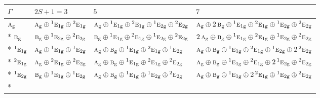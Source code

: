 \documentclass[10pt,a4paper]{article}
\numberwithin{equation}{section}
\newcommand{\irr}[1]{\text{\normalfont\scshape #1}}
\newcommand{\conjpair}[1]{{}^{#1}}
\newcommand{\ptag}[1]{\mathrm{#1}}
\begin{document}
{\small\setlength{\tabcolsep}{3pt}\begin{longtable}{@{}llll@{}}\toprule
$\Gamma$ & $2S + 1 = 3$ & $5$ & $7$\\\midrule\endhead
\bottomrule\endfoot\endlastfoot
$\irr{a}_{\ptag{g}}$ & $\irr{a}_{\ptag{g}}\oplus \conjpair{1}\irr{e}_{1\ptag{g}}\oplus \conjpair{2}\irr{e}_{1\ptag{g}}$ & $\irr{a}_{\ptag{g}}\oplus \conjpair{1}\irr{e}_{1\ptag{g}}\oplus \conjpair{2}\irr{e}_{1\ptag{g}}\oplus \conjpair{1}\irr{e}_{2\ptag{g}}\oplus \conjpair{2}\irr{e}_{2\ptag{g}}$ & $\irr{a}_{\ptag{g}}\oplus 2\,\irr{b}_{\ptag{g}}\oplus \conjpair{1}\irr{e}_{1\ptag{g}}\oplus \conjpair{2}\irr{e}_{1\ptag{g}}\oplus \conjpair{1}\irr{e}_{2\ptag{g}}\oplus \conjpair{2}\irr{e}_{2\ptag{g}}$\\*
$\irr{b}_{\ptag{g}}$ & $\irr{b}_{\ptag{g}}\oplus \conjpair{1}\irr{e}_{2\ptag{g}}\oplus \conjpair{2}\irr{e}_{2\ptag{g}}$ & $\irr{b}_{\ptag{g}}\oplus \conjpair{1}\irr{e}_{1\ptag{g}}\oplus \conjpair{2}\irr{e}_{1\ptag{g}}\oplus \conjpair{1}\irr{e}_{2\ptag{g}}\oplus \conjpair{2}\irr{e}_{2\ptag{g}}$ & $2\,\irr{a}_{\ptag{g}}\oplus \irr{b}_{\ptag{g}}\oplus \conjpair{1}\irr{e}_{1\ptag{g}}\oplus \conjpair{2}\irr{e}_{1\ptag{g}}\oplus \conjpair{1}\irr{e}_{2\ptag{g}}\oplus \conjpair{2}\irr{e}_{2\ptag{g}}$\\*
$\conjpair{1}\irr{e}_{1\ptag{g}}$ & $\irr{a}_{\ptag{g}}\oplus \conjpair{1}\irr{e}_{1\ptag{g}}\oplus \conjpair{1}\irr{e}_{2\ptag{g}}$ & $\irr{a}_{\ptag{g}}\oplus \irr{b}_{\ptag{g}}\oplus \conjpair{1}\irr{e}_{1\ptag{g}}\oplus \conjpair{2}\irr{e}_{1\ptag{g}}\oplus \conjpair{1}\irr{e}_{2\ptag{g}}$ & $\irr{a}_{\ptag{g}}\oplus \irr{b}_{\ptag{g}}\oplus \conjpair{1}\irr{e}_{1\ptag{g}}\oplus \conjpair{2}\irr{e}_{1\ptag{g}}\oplus \conjpair{1}\irr{e}_{2\ptag{g}}\oplus 2\,\conjpair{2}\irr{e}_{2\ptag{g}}$\\*
$\conjpair{2}\irr{e}_{1\ptag{g}}$ & $\irr{a}_{\ptag{g}}\oplus \conjpair{2}\irr{e}_{1\ptag{g}}\oplus \conjpair{2}\irr{e}_{2\ptag{g}}$ & $\irr{a}_{\ptag{g}}\oplus \irr{b}_{\ptag{g}}\oplus \conjpair{1}\irr{e}_{1\ptag{g}}\oplus \conjpair{2}\irr{e}_{1\ptag{g}}\oplus \conjpair{2}\irr{e}_{2\ptag{g}}$ & $\irr{a}_{\ptag{g}}\oplus \irr{b}_{\ptag{g}}\oplus \conjpair{1}\irr{e}_{1\ptag{g}}\oplus \conjpair{2}\irr{e}_{1\ptag{g}}\oplus 2\,\conjpair{1}\irr{e}_{2\ptag{g}}\oplus \conjpair{2}\irr{e}_{2\ptag{g}}$\\*
$\conjpair{1}\irr{e}_{2\ptag{g}}$ & $\irr{b}_{\ptag{g}}\oplus \conjpair{1}\irr{e}_{1\ptag{g}}\oplus \conjpair{1}\irr{e}_{2\ptag{g}}$ & $\irr{a}_{\ptag{g}}\oplus \irr{b}_{\ptag{g}}\oplus \conjpair{1}\irr{e}_{1\ptag{g}}\oplus \conjpair{1}\irr{e}_{2\ptag{g}}\oplus \conjpair{2}\irr{e}_{2\ptag{g}}$ & $\irr{a}_{\ptag{g}}\oplus \irr{b}_{\ptag{g}}\oplus \conjpair{1}\irr{e}_{1\ptag{g}}\oplus 2\,\conjpair{2}\irr{e}_{1\ptag{g}}\oplus \conjpair{1}\irr{e}_{2\ptag{g}}\oplus \conjpair{2}\irr{e}_{2\ptag{g}}$\\*

\end{longtable}}
\end{document}
